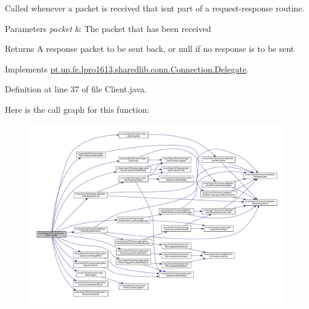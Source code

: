 Called whenever a packet is received that isn\textquotesingle{}t part of a request-\/response routine.


\begin{DoxyParams}{Parameters}
{\em packet} & The packet that has been received \\
\hline
\end{DoxyParams}
\begin{DoxyReturn}{Returns}
A response packet to be sent back, or null if no response is to be sent 
\end{DoxyReturn}


Implements \hyperlink{interfacept_1_1up_1_1fe_1_1lpro1613_1_1sharedlib_1_1conn_1_1_connection_1_1_delegate_a5b0f77e34d93967ae53cf7e01f0e2835}{pt.\+up.\+fe.\+lpro1613.\+sharedlib.\+conn.\+Connection.\+Delegate}.



Definition at line 37 of file Client.\+java.

Here is the call graph for this function\+:
\nopagebreak
\begin{figure}[H]
\begin{center}
\leavevmode
\includegraphics[width=350pt]{classpt_1_1up_1_1fe_1_1lpro1613_1_1server_1_1conn_1_1_client_a81efbd1e6b06189da5c814ac767a4a98_cgraph}
\end{center}
\end{figure}
\hypertarget{classpt_1_1up_1_1fe_1_1lpro1613_1_1server_1_1conn_1_1_client_aea2e952268afe16993958c8affb921cb}{}\label{classpt_1_1up_1_1fe_1_1lpro1613_1_1server_1_1conn_1_1_client_aea2e952268afe16993958c8affb921cb} 
